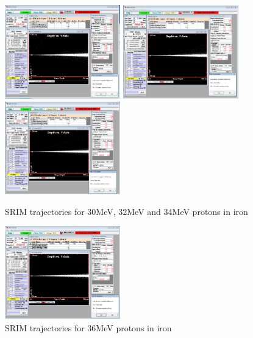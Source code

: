 \begin{figure}[!htb]
  \begin{center}
    \includegraphics[width=5.0cm]{appendix/srim_data/30MeV.png}
    \includegraphics[width=5.0cm]{appendix/srim_data/32MeV.png}
    \includegraphics[width=5.0cm]{appendix/srim_data/34MeV.png}
    \caption{SRIM trajectories for 30MeV, 32MeV and 34MeV protons in iron}
    \label{fig:srimiron-30-32-34}
  \end{center}
\end{figure}

\begin{figure}[!htb]
  \begin{center}
    \includegraphics[width=5.0cm]{appendix/srim_data/36MeV.png}
    \caption{SRIM trajectories for 36MeV protons in iron}
    \label{fig:srimiron-36}
  \end{center}
\end{figure}






